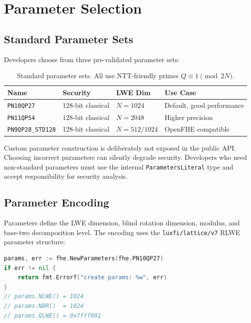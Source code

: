 \section{Parameter Selection}


\subsection{Standard Parameter Sets}

Developers choose from three pre-validated parameter sets:

\begin{table}[h]
\centering
\begin{tabular}{@{}llll@{}}
\toprule
\textbf{Name} & \textbf{Security} & \textbf{LWE Dim} & \textbf{Use Case} \\
\midrule
\texttt{PN10QP27} & 128-bit classical & $N=1024$ & Default, good performance \\
\texttt{PN11QP54} & 128-bit classical & $N=2048$ & Higher precision \\
\texttt{PN9QP28\_STD128} & 128-bit classical & $N=512/1024$ & OpenFHE compatible \\
\bottomrule
\end{tabular}
\caption{Standard parameter sets. All use NTT-friendly primes $Q \equiv 1 \pmod{2N}$.}
\label{tab:params}
\end{table}

Custom parameter construction is deliberately not exposed in the public API. Choosing incorrect parameters can silently degrade security. Developers who need non-standard parameters must use the internal \texttt{ParametersLiteral} type and accept responsibility for security analysis.

\subsection{Parameter Encoding}

Parameters define the LWE dimension, blind rotation dimension, modulus, and base-two decomposition level. The encoding uses the \texttt{luxfi/lattice/v7} RLWE parameter structure:

\begin{lstlisting}[language=Go]
params, err := fhe.NewParameters(fhe.PN10QP27)
if err != nil {
    return fmt.Errorf("create params: %w", err)
}
// params.NLWE() = 1024
// params.NBR()  = 1024
// params.QLWE() = 0x7fff801
\end{lstlisting}

